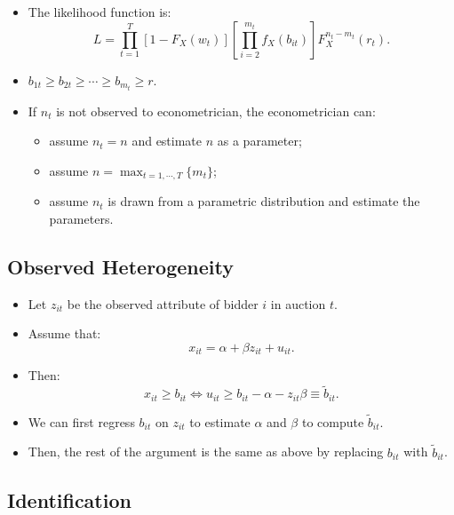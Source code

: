 \documentclass[]{book}
\providecommand{\tightlist}{%
  \setlength{\itemsep}{0pt}\setlength{\parskip}{0pt}}
\begin{document}
\begin{itemize}
\tightlist
\item
  The likelihood function is: \[
  L = \prod_{t = 1}^T [1 - F_X(w_t)] \left[ \prod_{i = 2}^{m_t} f_X(b_{it}) \right] F_X^{n_t - m_t}(r_t).
  \]
\item
  \(b_{1t} \ge b_{2t} \ge \cdots \ge b_{m_t} \ge r\).
\item
  If \(n_t\) is not observed to econometrician, the econometrician can:

  \begin{itemize}
  \tightlist
  \item
    assume \(n_t = n\) and estimate \(n\) as a parameter;
  \item
    assume \(n = \max_{t = 1, \cdots, T} \{m_t\}\);
  \item
    assume \(n_t\) is drawn from a parametric distribution and estimate
    the parameters.
  \end{itemize}
\end{itemize}

\subsection{Observed Heterogeneity}\label{observed-heterogeneity}

\begin{itemize}
\tightlist
\item
  Let \(z_{it}\) be the observed attribute of bidder \(i\) in auction
  \(t\).
\item
  Assume that: \[
  x_{it} = \alpha + \beta z_{it} + u_{it}.
  \]
\item
  Then: \[
  x_{it} \ge b_{it} \Leftrightarrow u_{it} \ge b_{it} - \alpha - z_{it} \beta \equiv \tilde{b}_{it}.
  \]
\item
  We can first regress \(b_{it}\) on \(z_{it}\) to estimate \(\alpha\)
  and \(\beta\) to compute \(\tilde{b}_{it}\).
\item
  Then, the rest of the argument is the same as above by replacing
  \(b_{it}\) with \(\tilde{b}_{it}\).
\end{itemize}

\subsection{Identification}\label{identification-2}
\end{document}
